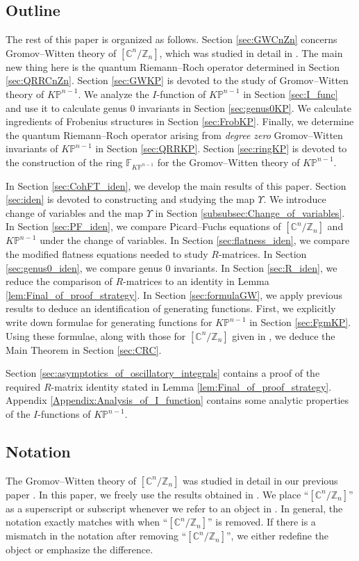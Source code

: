 \documentclass[12pt]{amsart}
\numberwithin{equation}{section}
\newcommand{\CnZn}{[\mathbb{C}^n/\mathbb{Z}_n]}
\newcommand{\KP}{K\mathbb{P}}
\begin{document}
\subsection{Outline}
The rest of this paper is organized as follows. Section \ref{sec:GWCnZn} concerns Gromov--Witten theory of $\CnZn$, which was studied in detail in \cite{gt}. The main new thing here is the quantum Riemann--Roch operator determined in Section \ref{sec:QRRCnZn}. Section \ref{sec:GWKP} is devoted to the study of Gromov--Witten theory of $\KP^{n-1}$. We analyze the $I$-function of $\KP^{n-1}$ in Section \ref{sec:I_func} and use it to calculate genus $0$ invariants in Section \ref{sec:genus0KP}. We calculate ingredients of Frobenius structures in Section \ref{sec:FrobKP}. Finally, we determine the quantum Riemann--Roch operator arising from {\em degree zero} Gromov--Witten invariants of $\KP^{n-1}$ in Section \ref{sec:QRRKP}. Section \ref{sec:ringKP} is devoted to the construction of the ring $\mathds{F}_{\KP^{n-1}}$ for the Gromov--Witten theory of $\KP^{n-1}$. 

In Section \ref{sec:CohFT_iden}, we develop the main results of this paper. Section \ref{sec:iden} is devoted to constructing and studying the map $\Upsilon$. We introduce change of variables and the map $\Upsilon$ in Section \ref{subsubsec:Change_of_variables}. In Section \ref{sec:PF_iden}, we compare Picard--Fuchs equations of $\CnZn$ and $\KP^{n-1}$ under the change of variables. In Section \ref{sec:flatness_iden}, we compare the modified flatness equations needed to study $R$-matrices. In Section \ref{sec:genus0_iden}, we compare genus $0$ invariants. In Section \ref{sec:R_iden}, we reduce the comparison of $R$-matrices to an identity in Lemma \ref{lem:Final_of_proof_strategy}. In Section \ref{sec:formulaGW}, we apply previous results to deduce an identification of generating functions. First, we explicitly write down formulae for generating functions for $\KP^{n-1}$ in Section \ref{sec:FgmKP}. Using these formulae, along with those for $\CnZn$ given in \cite[Proposition 3.3]{gt}, we deduce the Main Theorem in Section \ref{sec:CRC}.

Section \ref{sec:asymptotics_of_oscillatory_integrals} contains a proof of the required $R$-matrix identity stated in Lemma \ref{lem:Final_of_proof_strategy}. Appendix \ref{Appendix:Analysis_of_I_function} contains some analytic properties of the $I$-functions of $\KP^{n-1}$.

\subsection{Notation}
The Gromov--Witten theory of $\CnZn$ was studied in detail in our previous paper \cite{gt}. In this paper, we freely use the results obtained in \cite{gt}. We place ``$\CnZn$'' as a superscript or subscript whenever we refer to an object in \cite{gt}. In general, the notation exactly matches with \cite{gt} when ``$\CnZn$'' is removed. If there is a mismatch in the notation after removing ``$\CnZn$'', we either redefine the object or emphasize the difference.
\end{document}
